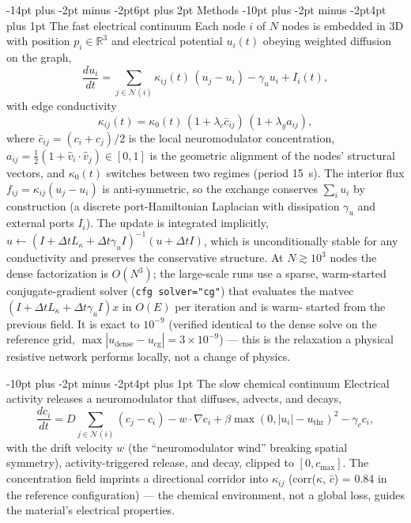 \documentclass[10pt]{article}
\makeatletter
\renewcommand\section{\@startsection{section}{1}{\z@}%
  {-14pt plus -2pt minus -2pt}{6pt plus 2pt}%
  {\normalfont\bfseries\large}}
\renewcommand\subsection{\@startsection{subsection}{2}{\z@}%
  {-10pt plus -2pt minus -2pt}{4pt plus 1pt}%
  {\normalfont\bfseries\normalsize}}
\makeatother
\begin{document}
\section{Methods}
\small
\subsection{The fast electrical continuum}
Each node $i$ of $N$ nodes is embedded in 3D with position $p_i \in \mathbb{R}^3$ and
electrical potential $u_i(t)$ obeying weighted diffusion on the graph,
\begin{equation}
\frac{du_i}{dt} = \sum_{j \in \mathcal{N}(i)} \kappa_{ij}(t)\,(u_j - u_i)
- \gamma_u u_i + I_i(t),
\end{equation}
with edge conductivity
\begin{equation}
\kappa_{ij}(t) = \kappa_0(t)\,(1 + \lambda_c \bar c_{ij})\,(1 + \lambda_g a_{ij}),
\end{equation}
where $\bar c_{ij} = (c_i + c_j)/2$ is the local neuromodulator concentration,
$a_{ij} = \tfrac{1}{2}(1 + \hat v_i \cdot \hat v_j) \in [0,1]$ is the geometric
alignment of the nodes' structural vectors, and $\kappa_0(t)$ switches between two
regimes (period 15~s). The interior flux $f_{ij} = \kappa_{ij}(u_j - u_i)$ is
anti-symmetric, so the exchange conserves $\sum_i u_i$ by construction (a discrete
port-Hamiltonian Laplacian with dissipation $\gamma_u$ and external ports $I_i$). The
update is integrated implicitly,
$u \leftarrow (I + \Delta t L_\kappa + \Delta t \gamma_u I)^{-1}(u + \Delta t I)$,
which is unconditionally stable for any conductivity and preserves the conservative
structure. At $N \gtrsim 10^3$ nodes the dense factorization is $O(N^3)$; the
large-scale runs use a sparse, warm-started conjugate-gradient solver
(\texttt{cfg solver="cg"}) that evaluates the matvec
$(I + \Delta t L_\kappa + \Delta t\gamma_u I)x$ in $O(E)$ per iteration and is warm-
started from the previous field. It is exact to $10^{-9}$ (verified identical to the
dense solve on the reference grid, $\max|u_{\mathrm{dense}} - u_{\mathrm{cg}}| =
3{\times}10^{-9}$) --- this is the relaxation a physical resistive network performs
locally, not a change of physics.

\subsection{The slow chemical continuum}
Electrical activity releases a neuromodulator that diffuses, advects, and decays,
\begin{equation}
\frac{dc_i}{dt} = D \sum_{j \in \mathcal{N}(i)}(c_j - c_i) - w \cdot \nabla c_i
+ \beta \max(0, |u_i| - u_{\mathrm{thr}})^2 - \gamma_c c_i,
\end{equation}
with the drift velocity $w$ (the ``neuromodulator wind'' breaking spatial symmetry),
activity-triggered release, and decay, clipped to $[0, c_{\max}]$. The concentration
field imprints a directional corridor into $\kappa_{ij}$ (corr($\kappa$, $\bar c$) =
0.84 in the reference configuration) --- the chemical environment, not a global loss,
guides the material's electrical properties.
\end{document}
